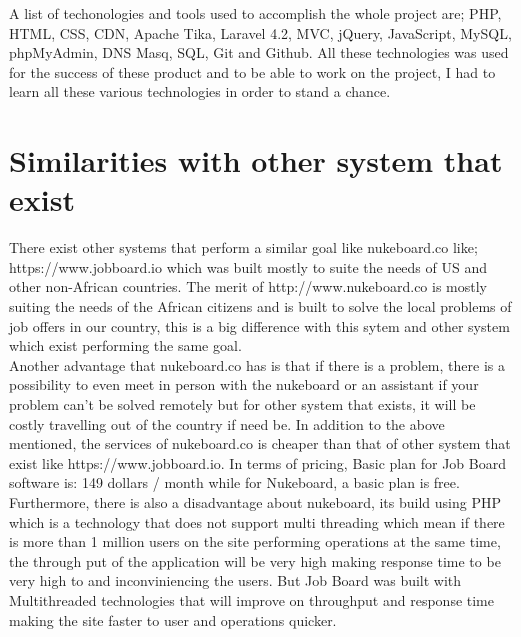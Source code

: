 A list of techonologies and tools used to accomplish the whole project are; PHP, HTML, CSS, CDN, Apache Tika, Laravel 4.2, MVC, jQuery, JavaScript, MySQL, phpMyAdmin, DNS Masq, SQL, Git and Github. All these technologies was used for the success of these product and to be able to work on the project, I had to learn all these various technologies in order to stand a chance. \\

\section{Similarities with other system that exist}

There exist other systems that perform a similar goal like nukeboard.co like; https://www.jobboard.io which was built mostly to suite the needs of US and other non-African countries. The merit of http://www.nukeboard.co is mostly suiting the needs of the African citizens and is built to solve the local problems of job offers in our country, this is a big difference with this sytem and other system which exist performing the same goal. \\

Another advantage that nukeboard.co has is that if there is a problem, there is a possibility to even meet in person with the nukeboard or an assistant if your problem can't be solved remotely but for other system that exists, it will be costly travelling out of the country if need be. In addition to the above mentioned, the services of nukeboard.co is cheaper than that of other system that exist like https://www.jobboard.io. In terms of pricing, Basic plan for Job Board software is: 149 dollars / month while for Nukeboard, a basic plan is free. \\

Furthermore, there is also a disadvantage about nukeboard, its build using PHP which is a technology that does not support multi threading which mean if there is more than 1 million users on the site performing operations at the same time, the through put of the application will be very high making response time to be very high to and inconviniencing the users. But Job Board was built with Multithreaded technologies that will improve on throughput and response time making the site faster to user and operations quicker.  